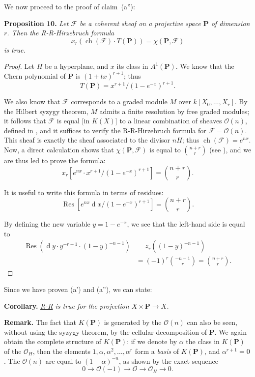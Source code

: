 \documentclass{article}
\newenvironment{itenv}[1]
  {\phantomsection\par\medskip\noindent\textbf{#1.}\itshape}
  {\medskip}
\newenvironment{rmenv}[1]
  {\phantomsection\par\medskip\noindent\textbf{#1.}\rmfamily}
  {\medskip}
\newcommand{\scr}[1]{{\mathscr{#1}}}
\newcommand{\PP}{\mathbf{P}}
\newcommand{\dd}{\operatorname{d}\!}
\DeclareMathOperator{\ch}{ch}
\newcommand{\oldpage}[1]{\marginpar{\footnotesize$\Big\vert$ \textit{p.~#1}}}
\begin{document}
We now proceed to the proof of claim~(a''):

\begin{itenv}{Proposition 10}
\label{proposition10}
  Let $\scr{F}$ be a coherent sheaf on a projective space $\PP$
\oldpage{119}
  of dimension $r$.
  Then the R-R-Hirzebruch formula
  \[
    x_r(\ch(\scr{F})\cdot T(\PP)) = \chi(\PP,\scr{F})
  \]
  is true.
\end{itenv}

\begin{proof}
  Let $H$ be a hyperplane, and $x$ its class in $A^1(\PP)$.
  We know that the Chern polynomial of $\PP$ is $(1+tx)^{r+1}$;
  thus
  \[
    T(\PP) = x^{r+1}/(1-e^{-x})^{r+1}.
  \]

  We also know that $\scr{F}$ corresponds to a graded module $M$ over $k[X_0,\ldots,X_r]$.
  By the Hilbert syzygy theorem, $M$ admits a finite resolution by free graded modules;
  it follows that $\scr{F}$ is equal [in $K(X)$] to a linear combination of sheaves $\scr{O}(n)$, defined in \cite[p.~246]{12}, and it suffices to verify the R-R-Hirzebruch formula for $\scr{F}=\scr{O}(n)$.
  This sheaf is exactly the sheaf associated to the divisor $nH$;
  thus $\ch(\scr{F})=e^{nx}$.
  Now, a direct calculation shows that $\chi(\PP,\scr{F})$ is equal to $\binom{n+r}{r}$ (see \cite[p.~275]{12}), and we are thus led to prove the formula:
  \[
  \label{10equation*}
    x_r[e^{nx}\cdot x^{r+1}/(1-e^{-x})^{r+1}] = \binom{n+r}{r}.
    \tag{$\star$}
  \]

  It is useful to write this formula in terms of residues:
  \[
  \label{10equation**}
    \operatorname{Res}[e^{nx}\dd x/(1-e^{-x})^{r+1}] = \binom{n+r}{r}.
    \tag{$\star\star$}
  \]

  By defining the new variable $y=1-e^{-x}$, we see that the left-hand side is equal to
  \begin{align*}
    \operatorname{Res}(\dd y\cdot y^{-r-1}\cdot(1-y)^{-n-1})
    &= z_r((1-y)^{-n-1})
  \\&= (-1)^r\binom{-n-1}{r}
    = \binom{n+r}{r}.
  \end{align*}
\end{proof}

Since we have proven (a') and (a''), we can state:

\begin{itenv}{Corollary}
  \hyperref[theoremriemannroch]{R-R} is true for the projection $X\times\PP\to X$.
\end{itenv}

\begin{rmenv}{Remark}
  The fact that $K(\PP)$ is generated by the $\scr{O}(n)$ can also be seen, without using the syzygy theorem, by the cellular decomposition of $\PP$.
  We again obtain the complete structure of $K(\PP)$:
  if we denote by $\alpha$ the class in $K(\PP)$ of the $\scr{O}_H$, then the elements $1,\alpha,\alpha^2,\ldots,\alpha^r$ form a \emph{basis} of $K(\PP)$, and $\alpha^{r+1}=0$.
  The $\scr{O}(n)$ are equal to $(1-\alpha)^{-n}$, as shown by the exact sequence
  \[
    0 \to \scr{O}(-1) \to \scr{O} \to \scr{O}_H \to 0.
  \]
\end{rmenv}
\end{document}
